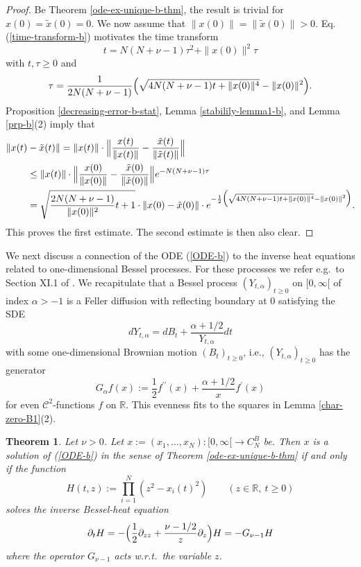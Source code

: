 \documentclass[reqno]{amsart}
\theoremstyle{plain}
\newtheorem{theorem}{Theorem}[section]
\theoremstyle{definition}
\numberwithin{equation}{section}
\begin{document}
\begin{proof}  Be Theorem \ref{ode-ex-unique-b-thm}, the result is trivial for $x(0)=\tilde x(0)=0$. We now assume that
   $\|x(0)\|=\|\tilde x(0)\|>0$.
Eq.~ (\ref{time-transform-b}) motivates the time transform
  $$t= N(N+\nu-1)\tau^2+ \|x(0)\|^2\tau$$
  with $t,\tau\ge 0$ and
  $$\tau = \frac{1}{2N(N+\nu-1)}\Bigl(\sqrt{ 4N(N+\nu-1)t +\|x(0)\|^4}- \|x(0)\|^2\Bigr).$$
   Proposition \ref{decreasing-error-b-stat}, Lemma \ref{stabilily-lemma1-b}, and Lemma \ref{prp-b}(2) imply that
  \begin{align}
    \|x(t)&-\tilde x(t)\|= \|x(t)\|\cdot
    \Bigl\| \frac{x(t)}{\|x(t)\|}- \frac{\tilde x(t)}{\|\tilde x(t)\|}\Bigr\|  \notag\\
  &\le\|x(t)\|\cdot \Bigl\| \frac{x(0)}{\|x(0)\|}- \frac{\tilde x(0)}{\|\tilde x(0)\|}\Bigr\|
 e^{- N(N+\nu-1)  \tau}\notag\\
&= \sqrt{\frac{2N(N+\nu-1)}{\|x(0)\|^2}t +1}\cdot \|x(0)-\tilde x(0)\|\cdot  e^{- \frac{1}{2} \Bigl(\sqrt{ 4N(N+\nu-1)t +\|x(0)\|^4}- \|x(0)\|^2\Bigr) }.
 \notag \end{align}
This proves the first estimate. The second estimate is then also clear. 
\end{proof}

We next discuss a connection  of the ODE (\ref{ODE-b}) to the
inverse heat equations related to one-dimensional Bessel processes. For these processes we refer e.g.~to Section XI.1 of
 \cite{RY}.
 We recapitulate that a Bessel process $(Y_{t,\alpha})_{t\ge0}$ on $[0,\infty[$ of index $\alpha>-1$ is a Feller diffusion with
     reflecting boundary at 0 satisfying the SDE
     $$dY_{t,\alpha}=dB_t + \frac{\alpha+1/2}{Y_{t,\alpha}}dt$$
     with some one-dimensional Brownian motion $(B_t)_{t\ge0}$,
     i.e., $(Y_{t,\alpha})_{t\ge0}$ has the generator
     $$G_\alpha f(x):=\frac{1}{2}f^{\prime\prime}(x)+ \frac{\alpha+1/2}{x}f^{\prime}(x)$$
       for even $\mathcal C^2$-functions $f$ on $\mathbb R$.
This evenness  fits to the squares in Lemma \ref{char-zero-B1}(2). 


\begin{theorem}\label{heat-equation-b}
  Let $\nu>0$.
  Let $x:=(x_1,\ldots,x_N):[0,\infty[\to C_N^B$ be.
      Then $x$ is a solution of (\ref{ODE-b}) in the sense of Theorem \ref{ode-ex-unique-b-thm}
      if and only if the function
      $$H(t,z):=\prod_{i=1}^N (z^2-x_i(t)^2) \quad\quad(z\in\mathbb R,\> t\ge0)$$
      solves the inverse Bessel-heat equation
      \begin{equation}\label{Bessel-heat}
        \partial_tH = -\Bigl(\frac{1}{2}\partial_{zz}+ \frac{\nu-1/2}{z}\partial_z\Bigr)H=-G_{\nu-1}H
      \end{equation}
      where the operator  $G_{\nu-1}$ acts w.r.t.~the variable $z$.
\end{theorem}
\end{document}

